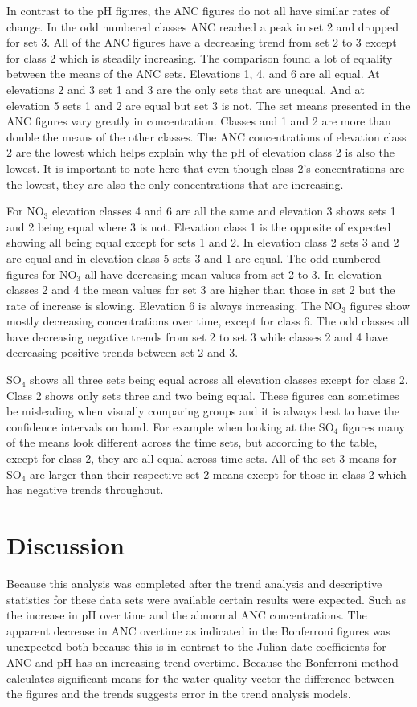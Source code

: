 In contrast to the pH figures, the ANC figures do not all have similar rates of change.
In the odd numbered classes ANC reached a peak in set 2 and dropped for set 3.
All of the ANC figures have a decreasing trend from set 2 to 3 except for class 2 which is steadily increasing. 
The comparison found a lot of equality between the means of the ANC sets.  
Elevations 1, 4, and 6 are all equal.  
At elevations 2 and 3 set 1 and 3 are the only sets that are unequal. 
And at elevation 5 sets 1 and 2 are equal but set 3 is not.
The set means presented in the ANC figures vary greatly in concentration.
Classes and 1 and 2 are more than double the means of the other classes.
The ANC concentrations of elevation class 2 are the lowest which helps explain why the pH of elevation class 2 is also the lowest.
It is important to note here that even though class 2's concentrations are the lowest, they are also the only concentrations that are increasing.

For NO$_3$ elevation classes 4 and 6 are all the same and elevation 3 shows sets 1 and 2 being equal where 3 is not.  
Elevation class 1 is the opposite of expected showing all being equal except for sets 1 and 2.  
In elevation class 2 sets 3 and 2 are equal and in elevation class 5 sets 3 and 1 are equal.
The odd numbered figures for NO$_3$ all have decreasing mean values from set 2 to 3.
In elevation classes 2 and 4 the mean values for set 3 are higher than those in set 2 but the rate of increase is slowing.
Elevation 6 is always increasing.
The NO$_3$ figures show mostly decreasing concentrations over time, except for class 6.
The odd classes all have decreasing negative trends from set 2 to set 3 while classes 2 and 4 have decreasing positive trends between set 2 and 3.

SO$_4$ shows all three sets being equal across all elevation classes except for class 2.  
Class 2 shows only sets three and two being equal.
These figures can sometimes be misleading when visually comparing groups and it is always best to have the confidence intervals on hand.
For example when looking at the SO$_4$ figures many of the means look different across the time sets, but according to the table, except for class 2, they are all equal across time sets.
All of the set 3 means for SO$_4$ are larger than their respective set 2 means except for those in class 2 which has negative trends throughout.

\section{Discussion}
Because this analysis was completed after the trend analysis and descriptive statistics for these data sets were available certain results were expected.
Such as the increase in pH over time and the abnormal ANC concentrations.
The apparent decrease in ANC overtime as indicated in the Bonferroni figures was unexpected both because this is in contrast to the Julian date coefficients for ANC and pH has an increasing trend overtime.
Because the Bonferroni method calculates significant means for the water quality vector the difference between the figures and the trends suggests error in the trend analysis models.


